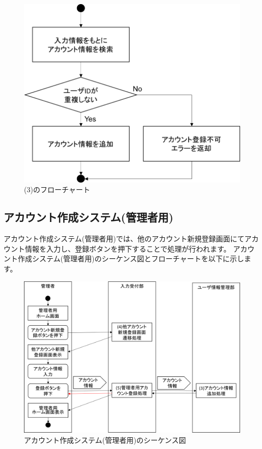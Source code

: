 \begin{figure}[htbp]
  \begin{center}
    \includegraphics[width=0.7\linewidth,clip]{./img/flow/3.png}
    \caption{(3)のフローチャート}\label{fig:3}
  \end{center}
\end{figure}




\clearpage




\subsection{アカウント作成システム(管理者用)}
アカウント作成システム(管理者用)では、他のアカウント新規登録画面にてアカウント情報を入力し、登録ボタンを押下することで処理が行われます。
アカウント作成システム(管理者用)のシーケンス図とフローチャートを以下に示します。

\begin{figure}[htbp]
  \begin{center}
    \includegraphics[width=1\linewidth,clip]{./img/seq2.png}
    \caption{アカウント作成システム(管理者用)のシーケンス図}\label{fig:seq2}
  \end{center}
\end{figure}

